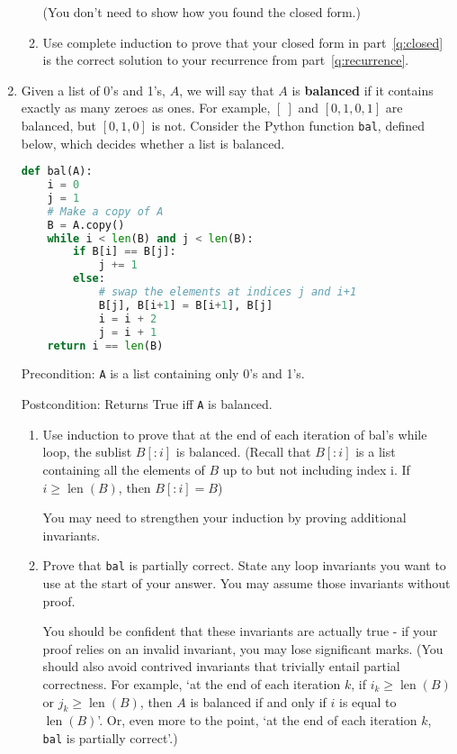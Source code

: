 \documentclass{article}
\newcommand{\C}[1]{\textup{\texttt{#1}}}
\newcommand{\emptylist}{[~]}
\DeclareMathOperator{\len}{len}
\newcommand{\worthMarks}[1]{[#1 marks] \par}
\begin{document}
\begin{enumerate}
\begin{enumerate}[label=(\alph*)]
(You don't need to show how you found the closed form.)

\item Use complete induction to prove that your closed form in
part~\ref{q:closed} is the correct solution to your recurrence from
part~\ref{q:recurrence}.
\end{enumerate}

\item \worthMarks{20}

Given a list of 0's and 1's, $A$, we will say that $A$ is \textbf{balanced} if it contains exactly as many zeroes as ones. For example, $\emptylist$ and $[0, 1, 0, 1]$ are balanced, but $[0, 1, 0]$ is not. Consider the Python function \texttt{bal}, defined below, which decides whether a list is balanced.

\begin{lstlisting}[language=Python]
def bal(A):
    i = 0
    j = 1
    # Make a copy of A
    B = A.copy()
    while i < len(B) and j < len(B):
        if B[i] == B[j]:
            j += 1
        else:
            # swap the elements at indices j and i+1
            B[j], B[i+1] = B[i+1], B[j]
            i = i + 2
            j = i + 1
    return i == len(B)
\end{lstlisting}

\noindent Precondition: \C{A} is a list containing only 0's and 1's.

\noindent Postcondition: Returns True iff \C{A} is balanced.

\begin{enumerate}
    \item

    Use induction to prove that at the end of each iteration of bal's while loop, the sublist $B[:i]$ is balanced. (Recall that $B[:i]$ is a list containing all the elements of $B$ up to but not including index i. If $i \geq \len(B)$, then $B[:i] = B$)
    
    You may need to strengthen your induction by proving additional invariants.
    
    \item

    Prove that \texttt{bal} is partially correct. State any loop invariants you want to use at the start of your answer. You may assume those invariants without proof.

You should be confident that these invariants are actually true - if your proof relies on an invalid invariant, you may lose significant marks. (You should also avoid contrived invariants that trivially entail partial correctness. For example, `at the end of each iteration $k$, if $i_k \ge \len(B)$ or $j_k \ge \len(B)$, then $A$ is balanced if and only if $i$ is equal to $\len(B)$'. Or, even more to the point, `at the end of each iteration $k$, \texttt{bal} is partially correct'.)
\end{enumerate}


\end{enumerate}
\end{document}
